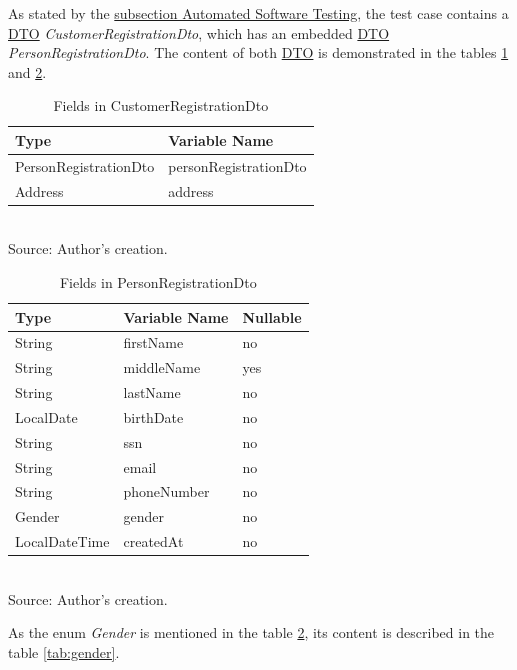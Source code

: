 As stated by the \hyperref[subsection:automated_software_testing]{subsection Automated Software Testing}, the test case contains a \hyperref[appendix:glossary]{DTO} \textit{CustomerRegistrationDto}, which has an embedded \hyperref[appendix:glossary]{DTO} \textit{PersonRegistrationDto}. The content of both \hyperref[appendix:glossary]{DTO} is demonstrated in the tables \ref{tab:customer_registration_dto} and \ref{tab:person_registration_dto}.

\begin{table}[H]
	\centering
	\caption{Fields in CustomerRegistrationDto}
	\begin{tabular}{ll}
		\toprule
		\textbf{Type} & \textbf{Variable Name} \\
		\midrule
		PersonRegistrationDto & personRegistrationDto \\ \hline
		Address & address \\
		\bottomrule
	\end{tabular}
	\\ \footnotesize Source: Author's creation.
	\label{tab:customer_registration_dto}
\end{table}

\begin{table}[H]
	\centering
	\caption{Fields in PersonRegistrationDto}
	\begin{tabular}{lll}
		\toprule
		\textbf{Type} & \textbf{Variable Name} & \textbf{Nullable} \\
		\midrule
		String & firstName & no \\ \hline
		String & middleName & yes \\ \hline
		String & lastName & no \\ \hline
		LocalDate & birthDate & no \\ \hline
		String & ssn & no \\ \hline
		String & email & no \\ \hline
		String & phoneNumber & no \\ \hline
		Gender & gender & no \\ \hline
		LocalDateTime & createdAt & no \\
		\bottomrule
	\end{tabular}
	\\ \footnotesize Source: Author's creation.
	\label{tab:person_registration_dto}
\end{table}

As the enum \textit{Gender} is mentioned in the table \ref{tab:person_registration_dto}, its content is described in the table \ref{tab:gender}.

